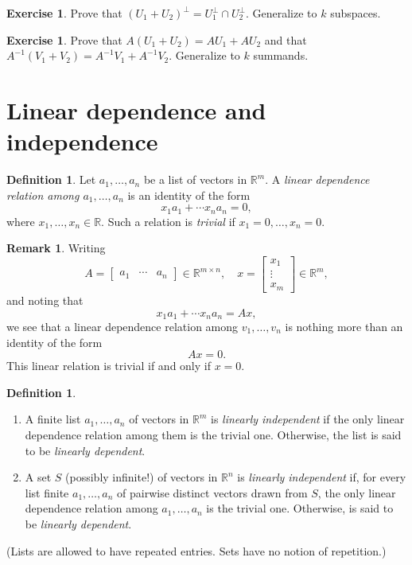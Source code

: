 \documentclass{amsart}
\newcommand{\RR}{\mathbb{R}}
\theoremstyle{definition}
\newtheorem{definition}[theorem]{Definition}
\newtheorem{remark}[theorem]{Remark}
\newtheorem{exercise}[theorem]{Exercise}
\begin{document}
\begin{exercise}
  Prove that $(U_1+U_2)^\perp = U_1^\perp\cap U_2^\perp$. Generalize to $k$ subspaces.
\end{exercise}


\begin{exercise}
  Prove that $A(U_1+U_2)=AU_1 + AU_2$ and that $A^{-1}(V_1+V_2)=A^{-1}V_1 + A^{-1}V_2$.
Generalize to $k$ summands.
\end{exercise}

\section{Linear dependence and independence}

  \begin{definition}
    Let $a_1,\ldots,a_n$ be a list of vectors in $\RR^m$.
  A \emph{linear dependence relation among $a_1,\ldots,a_n$} is an identity of the form
  $$
  x_1a_1+\cdots x_na_n=0,
  $$
  where $x_1,\ldots,x_n\in\RR$. Such a relation is \emph{trivial} if $x_1=0,\ldots, x_n=0$.
\end{definition}

\begin{remark}\label{remark:lin_comb_matvec}
Writing
\[
A=\begin{bmatrix}a_1&\cdots&a_n\end{bmatrix}\in \RR^{m\times n},\quad
x=\begin{bmatrix}x_1\\\vdots\\x_m\end{bmatrix}\in\RR^m,
\]
and noting that
\[
x_1a_1+\cdots x_na_n=Ax,
\]
we see that a linear dependence relation among $v_1,\ldots,v_n$ is nothing more than an identity of the form
\[
Ax=0.
\]
This linear relation is trivial if and only if $x=0$.
\end{remark}

\begin{definition}\hfill
\begin{enumerate}
  \setlength{\itemsep}{0.5em}
\item A finite list $a_1,\ldots,a_n$ of vectors in $\RR^m$ is \emph{linearly independent} if the only linear dependence relation among them is the trivial one. Otherwise, the list is said to be \emph{linearly dependent}.
\item A set $S$ (possibly infinite!) of vectors in $\RR^n$ is \emph{linearly independent} if, for every list finite $a_1,\ldots,a_n$ of pairwise distinct vectors drawn from $S$, the only linear dependence relation among $a_1,\ldots,a_n$ is the trivial one.  Otherwise, is said to be \emph{linearly dependent}.
\end{enumerate}
(Lists are allowed to have repeated entries. Sets have no notion of repetition.)
\end{definition}
\end{document}
